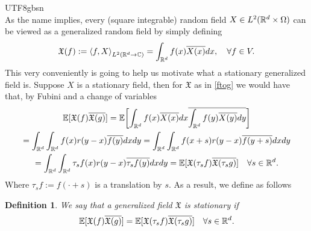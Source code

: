 \documentclass[12pt]{article}
\newtheorem{definition}{Definition}
\newcommand{\br}[1]{\left\langle#1\right\rangle}
\begin{document}
\begin{CJK*}{UTF8}{gbsn}
	\\
	As the name implies, every (square integrable) random field $X\in L^2({\mathbb R}^d\times\Omega)$ can be viewed as a generalized random field by simply defining
	\begin{equation}\label{ftog}
		\mathfrak{X} (f):=\br{f,X}_{L^2(\R^d\to\C)}=\int_{\R^d}f(x)\overline{X(x)} dx, \quad\forall f\in V.
	\end{equation}
	This very conveniently is going to help us motivate what a stationary generalized field is. Suppose $X$ is a stationary field, then for $\mathfrak{X} $ as in   \eqref{ftog} we would have that, by Fubini and a change of variables
	\begin{multline}\label{stat0}
		\mathbb{E}[\mathfrak{X}(f)\overline{\mathfrak{X}(g)}]=\mathbb{E}\qty[\int_{{\mathbb R}^d}f(x)\overline{X(x)} dx\overline{\int_{{\mathbb R}^d}f(y)\overline{X(y)} dy}]\\=\int_{{\mathbb R}^d}\int_{{\mathbb R}^d}f(x)r(y-x)\overline{f(y)} dx dy=\int_{{\mathbb R}^d}\int_{{\mathbb R}^d}f(x+s)r(y-x)\overline{f(y+s)} dx dy\\=\int_{{\mathbb R}^d}\int_{{\mathbb R}^d}\tau_sf(x)r(y-x)\overline{\tau_sf(y)} dx dy=\mathbb{E}[\mathfrak{X}(\tau_sf)\overline{\mathfrak{X}(\tau_sg)}]\quad\forall s\in {\mathbb R}^d.
	\end{multline}
	Where $\tau_sf:=f(\cdot +s)$ is a translation by $s$.
	As a result, we define as follows
	\begin{definition}
		We say that a generalized field $\mathfrak{X}$ is stationary if
		\begin{equation*}
			\mathbb{E}[\mathfrak{X}(f)\overline{\mathfrak{X}(g)}]=\mathbb{E}[\mathfrak{X}(\tau_sf)\overline{\mathfrak{X}(\tau_sg)}]\quad\forall s\in {\mathbb R}^d.
		\end{equation*}


\end{definition}
\end{CJK*}
\end{document}
